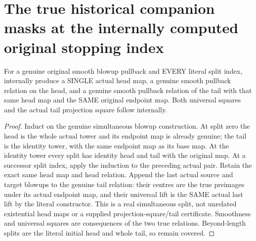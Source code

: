 \section{The true historical companion masks at the internally computed original stopping index}

\begin{theorem}
\label{hir:submersion-historical-masks-split}
\leanok
For a genuine original smooth blowup pullback and EVERY literal split index,
internally produce a SINGLE actual head map, a genuine smooth pullback
relation on the head, and a genuine smooth pullback relation of the tail
with that same head map and the SAME original endpoint map. Both universal
squares and the actual tail projection square follow internally.
\end{theorem}
\begin{proof}
Induct on the genuine simultaneous blowup construction. At split zero the
head is the whole actual tower and its endpoint map is already genuine; the
tail is the identity tower, with the same endpoint map as its base map. At
the identity tower every split has identity head and tail with the original
map. At a successor split index, apply the induction to the preceding
actual pair. Retain the exact same head map and head relation. Append the
last actual source and target blowups to the genuine tail relation: their
centres are the true preimages under its actual endpoint map, and their
universal lift is the SAME actual last lift by the literal constructor.
This is a real simultaneous split, not unrelated existential head maps or
a supplied projection-square/tail certificate. Smoothness and universal
squares are consequences of the two true relations. Beyond-length splits
are the literal initial head and whole tail, so remain covered.
\end{proof}

